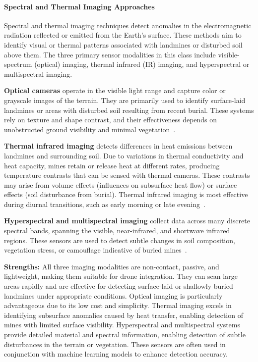 \paragraph{Spectral and Thermal Imaging Approaches}

Spectral and thermal imaging techniques detect anomalies in the electromagnetic radiation reflected or emitted from the Earth's surface. These methods aim to identify visual or thermal patterns associated with landmines or disturbed soil above them. The three primary sensor modalities in this class include visible-spectrum (optical) imaging, thermal infrared (IR) imaging, and hyperspectral or multispectral imaging.

\textbf{Optical cameras} operate in the visible light range and capture color or grayscale images of the terrain. They are primarily used to identify surface-laid landmines or areas with disturbed soil resulting from recent burial. These systems rely on texture and shape contrast, and their effectiveness depends on unobstructed ground visibility and minimal vegetation~\cite{cardonalandmine}.

\textbf{Thermal infrared imaging} detects differences in heat emissions between landmines and surrounding soil. Due to variations in thermal conductivity and heat capacity, mines retain or release heat at different rates, producing temperature contrasts that can be sensed with thermal cameras. These contrasts may arise from volume effects (influences on subsurface heat flow) or surface effects (soil disturbance from burial). Thermal infrared imaging is most effective during diurnal transitions, such as early morning or late evening~\cite{Bruschini1997ASO,paik2002image,source18}.

\textbf{Hyperspectral and multispectral imaging} collect data across many discrete spectral bands, spanning the visible, near-infrared, and shortwave infrared regions. These sensors are used to detect subtle changes in soil composition, vegetation stress, or camouflage indicative of buried mines~\cite{robledo2009survey,alqudsi2021review}.

\textbf{Strengths:} All three imaging modalities are non-contact, passive, and lightweight, making them suitable for drone integration. They can scan large areas rapidly and are effective for detecting surface-laid or shallowly buried landmines under appropriate conditions. Optical imaging is particularly advantageous due to its low cost and simplicity. Thermal imaging excels in identifying subsurface anomalies caused by heat transfer, enabling detection of mines with limited surface visibility. Hyperspectral and multispectral systems provide detailed material and spectral information, enabling detection of subtle disturbances in the terrain or vegetation. These sensors are often used in conjunction with machine learning models to enhance detection accuracy.

